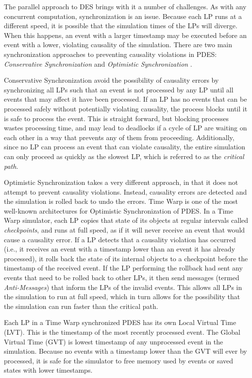 \documentclass[11pt]{book}
\begin{document}
The parallel approach to DES brings with it a number of challenges. As with any concurrent computation, synchronization is an issue. Because each LP runs at a different speed, it is possible that the simulation times of the LPs will diverge. When this happens, an event with a larger timestamp may be executed before an event with a lower, violating causality of the simulation. There are two main synchronization approaches to preventing causality violations in PDES: \emph{Conservative Synchronization} and \emph{Optimistic Synchronization} \cite{fujimoto-90}.

Conservative Synchronization avoid the possibility of causality errors by synchronizing all LPs such that an event is not processed by any LP until all events that may affect it have been processed. If an LP has no events that can be processed safely without potentially violating causality, the process blocks until it is safe to process the event. This is straight forward, but blocking processes wastes processing time, and may lead to deadlocks if a cycle of LP are waiting on each other in a way that prevents any of them from proceeding. Additionally, since no LP can process an event that can violate causality, the entire simulation can only proceed as quickly as the slowest LP, which is referred to as the \emph{critical path}.

Optimistic Synchronization takes a very different approach, in that it does not attempt to prevent causality violations. Instead, causality errors are detected and the simulation is rolled back to undo the errors. Time Warp is one of the most well-known architectures for Optimistic Synchronization of PDES. In a Time Warp simulator, each LP copies that state of its objects at regular intervals called \emph{checkpoints}, and runs at full speed, as if it will never receive an event that would cause a causality error. If a LP detects that a causality violation has occurred (i.e., it receives an event with a timestamp lower than an event it has already processed), it rolls back the state of its internal objects to a checkpoint before the timestamp of the received event. If the LP performing the rollback had sent any events that need to be rolled back to other LPs, it then send messages (termed \emph{Anti-Messages}) that inform the LPs of the invalid events. This allows all LPs in the simulation to run at full speed, which in turn allows for the possibility that the simulation can run faster than the critical path. 

Each LP in a Time Warp synchronized PDES has its own Local Virtual Time (LVT). This is the timestamp of the most recently processed event. The Global Virtual Time (GVT) is lowest timestamp of any unprocessed event in the simulation. Because no events with a timestamp lower than the GVT will ever by processed, it is safe for the simulator to free memory used  by events or saved states with lower timestamps.
\end{document}

